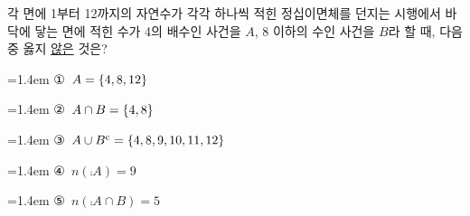 각 면에 1부터 12까지의 자연수가 각각 하나씩 적힌 정십이면체를 던지는 시행에서 바닥에 닿는 면에 적힌 수가 4의 배수인 사건을 $A$, 8 이하의 수인 사건을 $B$라 할 때, 다음 중 옳지 \underline{않은} 것은?
\par\medskip\par\noindent\hangindent=1.4em {\small ①}\ $A=\{4{,}\mkern3mu\mathopen{}8{,}\mkern3mu\mathopen{}12\}$\par\noindent\hangindent=1.4em {\small ②}\ $A\cap B=\{4{,}\mkern3mu\mathopen{}8\}$\par\noindent\hangindent=1.4em {\small ③}\ $A\cup {B}^{\mathrm{c}}=\{4{,}\mkern3mu\mathopen{}8{,}\mkern3mu\mathopen{}9{,}\mkern3mu\mathopen{}10{,}\mkern3mu\mathopen{}11{,}\mkern3mu\mathopen{}12\}$\par\noindent\hangindent=1.4em {\small ④}\ $n(\comp{A})=9$\par\noindent\hangindent=1.4em {\small ⑤}\ $n(\comp{A}\cap B)=5$\par\medskip
